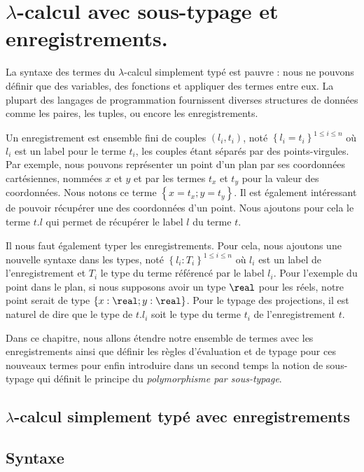 \chapter{$\lambda$-calcul avec sous-typage et enregistrements.}
\label{chapter:lambda-calculus-with-records}

La syntaxe des termes du $\lambda$-calcul simplement typé est pauvre : nous ne pouvons définir que des
variables, des fonctions et appliquer des termes entre eux.
La plupart des langages de programmation fournissent diverses structures de
données comme les paires, les tuples, ou encore les enregistrements.

Un enregistrement est ensemble fini de couples $(l_{i}, t_{i})$, noté $\left\{
  l_{i} = t_{i} \right\}^{1 \leq i \leq n}$ où $l_{i}$ est
un label pour le terme $t_{i}$, les couples étant séparés par des points-virgules. Par exemple, nous pouvons représenter un point
d'un plan par ses coordonnées cartésiennes, nommées $x$ et $y$ et par les termes
$t_{x}$ et $t_{y}$ pour la valeur des coordonnées. Nous notons ce terme
$\left\{ x = t_{x} ; y = t_{y} \right\}$.
Il est également intéressant de pouvoir récupérer une des coordonnées d'un
point.
Nous ajoutons pour cela le terme $t.l$ qui permet de récupérer le label $l$ du
terme $t$.

Il nous faut également typer les enregistrements. Pour cela, nous ajoutons une
nouvelle syntaxe dans les types, noté $\left\{l_{i} : T_{i}\right\}^{1 \leq i
  \leq n}$ où $l_{i}$
est un label de l'enregistrement et $T_{i}$ le type du terme référencé par le
label $l_{i}$. Pour l'exemple du point dans le plan, si nous supposons avoir un
type $\real$ pour les réels, notre point serait de type $\left\{ x : \real ; y : \real
\right\}$. Pour le typage des projections, il est naturel de dire que le type de
$t.l_{i}$ soit le type du terme $t_{i}$ de l'enregistrement $t$.

Dans ce chapitre, nous allons étendre notre ensemble de termes avec les
enregistrements ainsi que définir les règles d'évaluation et de typage pour ces
nouveaux termes pour enfin introduire dans un second temps la notion de
sous-typage qui définit le principe du \textit{polymorphisme par sous-typage}.

\section{$\lambda$-calcul simplement typé avec enregistrements}

\section*{Syntaxe}

